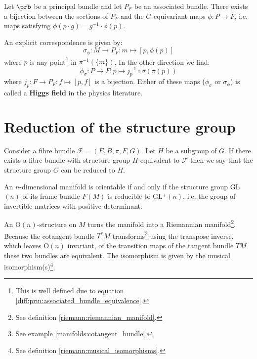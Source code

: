 	\begin{property}\label{diff:prin:section_bijection}
		Let $\prb$ be a principal bundle and let $P_F$ be an associated bundle. There exists a bijection between the sections of $P_F$ and the $G$-equivariant maps $\phi:P\rightarrow F$, i.e. maps satisfying $\phi(p\cdot g) = g^{-1}\cdot\phi(p)$.
		
		An explicit correspondence is given by:
		\begin{equation}
			\sigma_\phi:M\rightarrow P_F:m\mapsto [p, \phi(p)]
		\end{equation}
		where $p$ is any point\footnote{This is well defined due to equation \ref{diff:prin:associated_bundle_equivalence}.} in $\pi^{-1}(\{m\})$. In the other direction we find:
		\begin{equation}
			\label{diff:prin:section_bijection_phi}
			\phi_\sigma:P\rightarrow F: p\mapsto j_p^{-1}\circ\sigma(\pi(p))
		\end{equation}
		where $j_p:F\rightarrow P_F:f\mapsto[p, f]$ is a bijection. Either of these maps ($\phi_\sigma$ or $\sigma_\phi$) is called a \textbf{Higgs field} in the physics literature.
	\end{property}

\section{Reduction of the structure group}

	\begin{construct}
		Consider a fibre bundle $\mathcal{F} = (E, B, \pi, F, G)$. Let $H$ be a subgroup of $G$. If there exists a fibre bundle with structure group $H$ equivalent to $\mathcal{F}$ then we say that the structure group $G$ can be reduced to $H$.
	\end{construct}
	
	
	\begin{example}
		An $n$-dimensional manifold is orientable if and only if the structure group GL$(n)$ of its frame bundle $F(M)$ is reducible to GL$^+(n)$, i.e. the group of invertible matrices with positive determinant. 
	\end{example}
	\begin{example}
		An O$(n)$-structure on $M$ turns the manifold into a Riemannian manifold\footnote{See definition \ref{riemann:riemannian_manifold}.}. Because the cotangent bundle $T^*M$ transforms\footnote{See example \ref{manifolds:cotangent_bundle}.} using the transpose inverse, which leaves O$(n)$ invariant, of the transition maps of the tangent bundle $TM$ these two bundles are equivalent. The isomorphism is given by the musical isomorphism(s)\footnote{See definition \ref{riemann:musical_isomorphisms}.}.
	\end{example}
	

